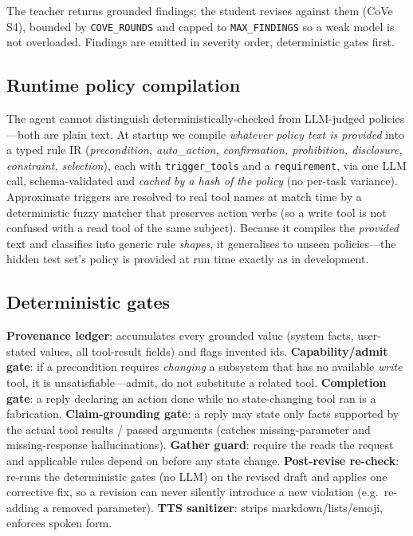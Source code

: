 \documentclass{article}
\begin{document}
The teacher returns grounded findings; the student revises against them (CoVe S4),
bounded by \texttt{COVE\_ROUNDS} and capped to \texttt{MAX\_FINDINGS} so a weak model
is not overloaded. Findings are emitted in severity order, deterministic gates first.

\subsection{Runtime policy compilation}
The agent cannot distinguish deterministically-checked from LLM-judged policies---both
are plain text. At startup we compile \emph{whatever policy text is provided} into a
typed rule IR (\emph{precondition, auto\_action, confirmation, prohibition, disclosure,
constraint, selection}), each with \texttt{trigger\_tools} and a \texttt{requirement},
via one LLM call, schema-validated and \emph{cached by a hash of the policy} (no
per-task variance). Approximate triggers are resolved to real tool names at match time
by a deterministic fuzzy matcher that preserves action verbs (so a write tool is not
confused with a read tool of the same subject). Because it compiles the \emph{provided}
text and classifies into generic rule \emph{shapes}, it generalises to unseen
policies---the hidden test set's policy is provided at run time exactly as in
development.

\subsection{Deterministic gates}
\textbf{Provenance ledger}: accumulates every grounded value (system facts,
user-stated values, all tool-result fields) and flags invented ids.
\textbf{Capability/admit gate}: if a precondition requires \emph{changing} a subsystem
that has no available \emph{write} tool, it is unsatisfiable---admit, do not substitute
a related tool. \textbf{Completion gate}: a reply declaring an action done while no
state-changing tool ran is a fabrication. \textbf{Claim-grounding gate}: a reply may
state only facts supported by the actual tool results / passed arguments (catches
missing-parameter and missing-response hallucinations). \textbf{Gather guard}: require
the reads the request and applicable rules depend on before any state change.
\textbf{Post-revise re-check}: re-runs the deterministic gates (no LLM) on the revised
draft and applies one corrective fix, so a revision can never silently introduce a new
violation (e.g.\ re-adding a removed parameter). \textbf{TTS sanitizer}: strips
markdown/lists/emoji, enforces spoken form.
\end{document}
